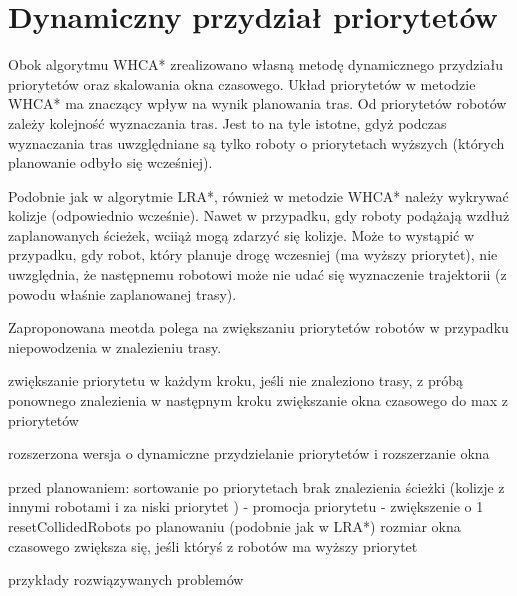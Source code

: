 \section{Dynamiczny przydział priorytetów}
\label{ch:alg-priorities-allocation}

Obok algorytmu WHCA* zrealizowano własną metodę dynamicznego przydziału priorytetów oraz skalowania okna czasowego.
Układ priorytetów w metodzie WHCA* ma znaczący wpływ na wynik planowania tras. Od priorytetów robotów zależy kolejność wyznaczania tras.
Jest to na tyle istotne, gdyż podczas wyznaczania tras uwzględniane są tylko roboty o priorytetach wyższych (których planowanie odbyło się wcześniej).

Podobnie jak w algorytmie LRA*, również w metodzie WHCA* należy wykrywać kolizje (odpowiednio wcześnie).
Nawet w przypadku, gdy roboty podążają wzdłuż zaplanowanych ścieżek, wciiąż mogą zdarzyć się kolizje.
Może to wystąpić w przypadku, gdy robot, który planuje drogę wczesniej (ma wyższy priorytet), nie uwzględnia, że następnemu robotowi może nie udać się wyznaczenie trajektorii (z powodu właśnie zaplanowanej trasy).




Zaproponowana meotda polega na zwiększaniu priorytetów robotów w przypadku niepowodzenia w znalezieniu trasy.


zwiększanie priorytetu w każdym kroku, jeśli nie znaleziono trasy, z próbą ponownego znalezienia w następnym kroku
zwiększanie okna czasowego do max z priorytetów


rozszerzona wersja o dynamiczne przydzielanie priorytetów i rozszerzanie okna

przed planowaniem: sortowanie po priorytetach
brak znalezienia ścieżki (kolizje z innymi robotami i za niski priorytet ) - promocja priorytetu - zwiększenie o 1 
resetCollidedRobots po planowaniu (podobnie jak w LRA*)
rozmiar okna czasowego zwiększa się, jeśli któryś z robotów ma wyższy priorytet

przykłady rozwiązywanych problemów
